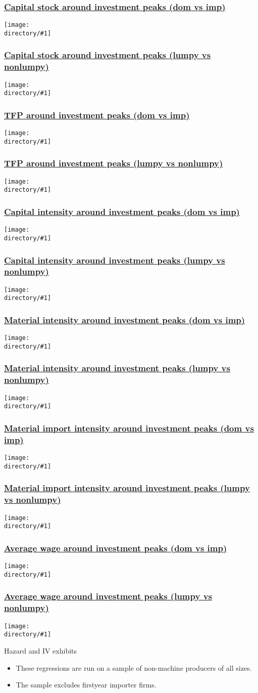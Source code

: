 \documentclass[10pt]{beamer}
\newcommand{\directory}{figures}
\newcommand{\longfigure}[2]{\begin{frame}\frametitle{\hyperlink{#1back}{#2}}\hypertarget{#1}{{\begin{center}\texttt{[image: \\directory/\#1]}\end{center}}}\end{frame}}
\begin{document}
\longfigure{ES_lnK}{Capital stock around investment peaks (dom vs imp)}
\longfigure{ES_lumpy_lnK}{Capital stock around investment peaks (lumpy vs nonlumpy)}
\longfigure{ES_TFP}{TFP around investment peaks (dom vs imp)}
\longfigure{ES_lumpy_TFP}{TFP around investment peaks (lumpy vs nonlumpy)}
\longfigure{ES_ln_K_L}{Capital intensity around investment peaks (dom vs imp)}
\longfigure{ES_lumpy_ln_K_L}{Capital intensity around investment peaks (lumpy vs nonlumpy)}
\longfigure{ES_ln_M_L}{Material intensity around investment peaks (dom vs imp)}
\longfigure{ES_lumpy_ln_M_L}{Material intensity around investment peaks (lumpy vs nonlumpy)}
\longfigure{ES_matimpshare}{Material import intensity around investment peaks (dom vs imp)}
\longfigure{ES_lumpy_matimpshare}{Material import intensity around investment peaks (lumpy vs nonlumpy)}
\longfigure{ES_ln_wage}{Average wage around investment peaks (dom vs imp)}
\longfigure{ES_lumpy_ln_wage}{Average wage around investment peaks (lumpy vs nonlumpy)}

\begin{frame}{Hazard and IV exhibits}
\begin{itemize}
	\item These regressions are run on a sample of non-machine producers of all sizes.
	\item The sample excludes firstyear importer firms.
\end{itemize}
\end{frame}
\end{document}
